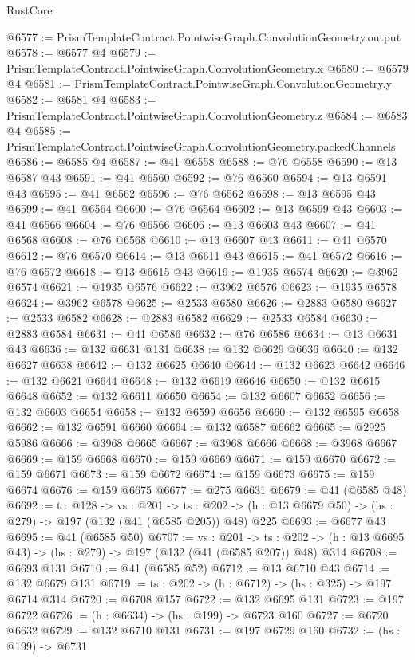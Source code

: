 \begin{lexlean}{RustCore}
\begin{coremodule}
@6577 := PrismTemplateContract.PointwiseGraph.ConvolutionGeometry.output
@6578 := @6577 @4
@6579 := PrismTemplateContract.PointwiseGraph.ConvolutionGeometry.x
@6580 := @6579 @4
@6581 := PrismTemplateContract.PointwiseGraph.ConvolutionGeometry.y
@6582 := @6581 @4
@6583 := PrismTemplateContract.PointwiseGraph.ConvolutionGeometry.z
@6584 := @6583 @4
@6585 := PrismTemplateContract.PointwiseGraph.ConvolutionGeometry.packedChannels
@6586 := @6585 @4
@6587 := @41 @6558
@6588 := @76 @6558
@6590 := @13 @6587 @43
@6591 := @41 @6560
@6592 := @76 @6560
@6594 := @13 @6591 @43
@6595 := @41 @6562
@6596 := @76 @6562
@6598 := @13 @6595 @43
@6599 := @41 @6564
@6600 := @76 @6564
@6602 := @13 @6599 @43
@6603 := @41 @6566
@6604 := @76 @6566
@6606 := @13 @6603 @43
@6607 := @41 @6568
@6608 := @76 @6568
@6610 := @13 @6607 @43
@6611 := @41 @6570
@6612 := @76 @6570
@6614 := @13 @6611 @43
@6615 := @41 @6572
@6616 := @76 @6572
@6618 := @13 @6615 @43
@6619 := @1935 @6574
@6620 := @3962 @6574
@6621 := @1935 @6576
@6622 := @3962 @6576
@6623 := @1935 @6578
@6624 := @3962 @6578
@6625 := @2533 @6580
@6626 := @2883 @6580
@6627 := @2533 @6582
@6628 := @2883 @6582
@6629 := @2533 @6584
@6630 := @2883 @6584
@6631 := @41 @6586
@6632 := @76 @6586
@6634 := @13 @6631 @43
@6636 := @132 @6631 @131
@6638 := @132 @6629 @6636
@6640 := @132 @6627 @6638
@6642 := @132 @6625 @6640
@6644 := @132 @6623 @6642
@6646 := @132 @6621 @6644
@6648 := @132 @6619 @6646
@6650 := @132 @6615 @6648
@6652 := @132 @6611 @6650
@6654 := @132 @6607 @6652
@6656 := @132 @6603 @6654
@6658 := @132 @6599 @6656
@6660 := @132 @6595 @6658
@6662 := @132 @6591 @6660
@6664 := @132 @6587 @6662
@6665 := @2925 @5986
@6666 := @3968 @6665
@6667 := @3968 @6666
@6668 := @3968 @6667
@6669 := @159 @6668
@6670 := @159 @6669
@6671 := @159 @6670
@6672 := @159 @6671
@6673 := @159 @6672
@6674 := @159 @6673
@6675 := @159 @6674
@6676 := @159 @6675
@6677 := @275 @6631
@6679 := @41 (@6585 @48)
@6692 := {t : @128} ->
  {vs : @201} ->
  {ts : @202} -> (h : @13 @6679 @50) -> (hs : @279) -> @197 (@132 (@41 (@6585 @205)) @48) @225
@6693 := @6677 @43
@6695 := @41 (@6585 @50)
@6707 := {vs : @201} ->
  {ts : @202} -> (h : @13 @6695 @43) -> (hs : @279) -> @197 (@132 (@41 (@6585 @207)) @48) @314
@6708 := @6693 @131
@6710 := @41 (@6585 @52)
@6712 := @13 @6710 @43
@6714 := @132 @6679 @131
@6719 := {ts : @202} -> (h : @6712) -> (hs : @325) -> @197 @6714 @314
@6720 := @6708 @157
@6722 := @132 @6695 @131
@6723 := @197 @6722
@6726 := (h : @6634) -> (hs : @199) -> @6723 @160
@6727 := @6720 @6632
@6729 := @132 @6710 @131
@6731 := @197 @6729 @160
@6732 := (hs : @199) -> @6731

\end{coremodule}
\end{lexlean}
